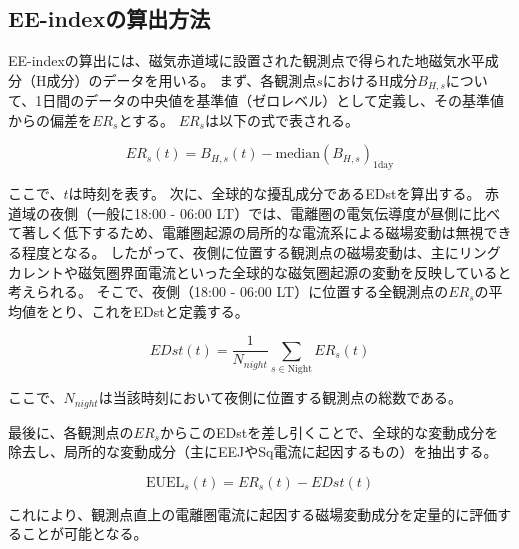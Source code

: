 \subsection{EE-indexの算出方法}

EE-indexの算出には、磁気赤道域に設置された観測点で得られた地磁気水平成分（H成分）のデータを用いる。
まず、各観測点$s$におけるH成分$B_{H,s}$について、1日間のデータの中央値を基準値（ゼロレベル）として定義し、その基準値からの偏差を$ER_s$とする。
$ER_s$は以下の式で表される。

\begin{equation}
  ER_s(t) = B_{H,s}(t) - \text{median}(B_{H,s})_{\text{1day}}
\end{equation}

ここで、$t$は時刻を表す。
次に、全球的な擾乱成分であるEDstを算出する。
赤道域の夜側（一般に18:00 - 06:00 LT）では、電離圏の電気伝導度が昼側に比べて著しく低下するため、電離圏起源の局所的な電流系による磁場変動は無視できる程度となる。
したがって、夜側に位置する観測点の磁場変動は、主にリングカレントや磁気圏界面電流といった全球的な磁気圏起源の変動を反映していると考えられる。
そこで、夜側（18:00 - 06:00 LT）に位置する全観測点の$ER_s$の平均値をとり、これをEDstと定義する。

\begin{equation}
  EDst(t) = \frac{1}{N_{night}} \sum_{s \in \text{Night}} ER_s(t)
\end{equation}

ここで、$N_{night}$は当該時刻において夜側に位置する観測点の総数である。

最後に、各観測点の$ER_s$からこのEDstを差し引くことで、全球的な変動成分を除去し、局所的な変動成分（主にEEJやSq電流に起因するもの）を抽出する。

\begin{equation}
  \text{EUEL}_s(t) = ER_s(t) - EDst(t)
\end{equation}

これにより、観測点直上の電離圏電流に起因する磁場変動成分を定量的に評価することが可能となる。

